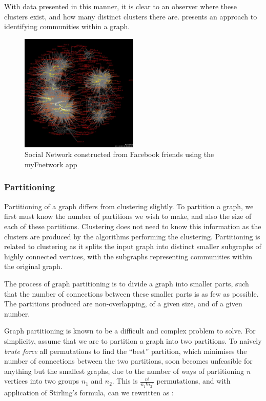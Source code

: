 With data presented in this manner, it is clear to an observer where these clusters exist, and how many distinct clusters there are. \cite{girvan02} presents an approach to identifying communities within a graph.

\begin{figure}[htbp]
\centering
\includegraphics[width=0.5\textwidth]{./img/socialnetwork.png}
\caption{Social Network constructed from Facebook friends using the myFnetwork app}
\label{fig:socialnetwork}
\end{figure}

\subsubsection{Partitioning}
Partitioning of a graph differs from clustering slightly. To partition a graph, we first must know the number of partitions we wish to make, and also the size of each of these partitions. Clustering does not need to know this information as the clusters are produced by the algorithms performing the clustering. Partitioning is related to clustering as it splits the input graph into distinct smaller subgraphs of highly connected vertices, with the subgraphs representing communities within the original graph.

The process of graph partitioning is to divide a graph into smaller parts, such that the number of connections between these smaller parts is as few as possible. The partitions produced are non-overlapping, of a given size, and of a given number.

Graph partitioning is known to be a difficult and complex problem to solve. For simplicity, assume that we are to partition a graph into two partitions. To naively \emph{brute force} all permutations to find the ``best'' partition, which minimises the number of connections between the two partitions, soon becomes unfeasible for anything but the smallest graphs, due to the number of ways of partitioning \emph{n} vertices into two groups \emph{$n_1$} and \emph{$n_2$}. This is $\frac{n!}{n_1!n_2!}$ permutations, and with application of Stirling's formula, can we rewritten as \cite{newman10}:

